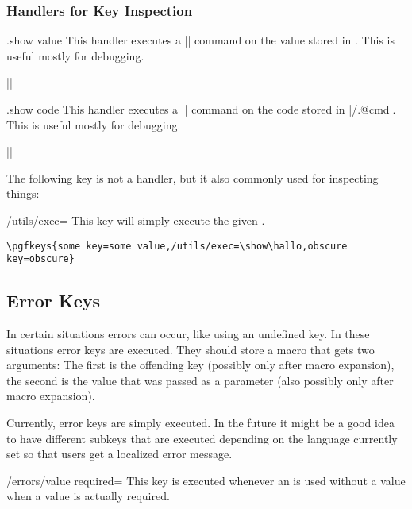 \subsubsection{Handlers for Key Inspection}

\begin{handler}{{.show value}}
    This handler executes a |\show| command on the value stored in .
    This is useful mostly for debugging.

    \example ||
\end{handler}

\begin{handler}{{.show code}}
    This handler executes a |\show| command on the code stored in
    |/.@cmd|. This is useful mostly for debugging.

    \example ||
\end{handler}

The following key is not a handler, but it also commonly used for inspecting
things:
%
\begin{key}{/utils/exec=}
    This key will simply execute the given .

    \example \verb|\pgfkeys{some key=some value,/utils/exec=\show\hallo,obscure key=obscure}|
\end{key}


\subsection{Error Keys}

In certain situations errors can occur, like using an undefined key. In these
situations error keys are executed. They should store a macro that gets two
arguments: The first is the offending key (possibly only after macro
expansion), the second is the value that was passed as a parameter (also
possibly only after macro expansion).

Currently, error keys are simply executed. In the future it might be a good
idea to have different subkeys that are executed depending on the language
currently set so that users get a localized error message.

\begin{key}{/errors/value required=}
    This key is executed whenever an  is used without a
    value when a value is actually required.
\end{key}


